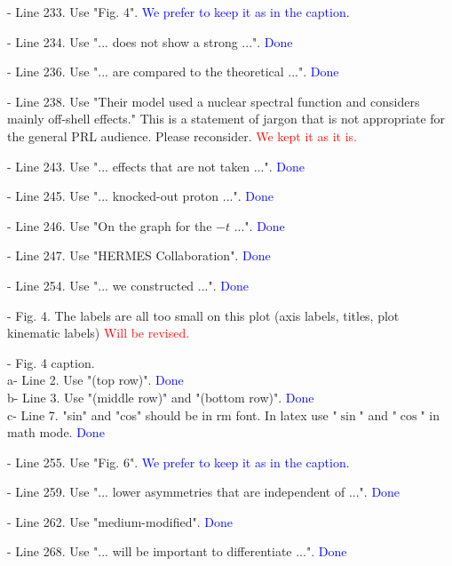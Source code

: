 \documentclass[a4paper,11pt,twoside]{article}
\begin{document}
\begin{enumerate}
- Line 233. Use "Fig. 4".
      \textcolor{blue}{We prefer to keep it as in the caption.}

- Line 234. Use "... does not show a strong ...".
      \textcolor{blue}{Done}

- Line 236. Use "... are compared to the theoretical ...".
      \textcolor{blue}{Done}

- Line 238. Use "Their model used a nuclear spectral function and considers 
   mainly off-shell effects." This is a statement of jargon that is not 
   appropriate for the general PRL audience.  Please reconsider.
      \textcolor{red}{We kept it as it is.}

- Line 243. Use "... effects that are not taken ...".
      \textcolor{blue}{Done}

- Line 245. Use "... knocked-out proton ...".
      \textcolor{blue}{Done}

- Line 246. Use "On the graph for the $-t$ ...".
      \textcolor{blue}{Done}

- Line 247. Use "HERMES Collaboration".
      \textcolor{blue}{Done}

- Line 254. Use "... we constructed ...".
      \textcolor{blue}{Done}

- Fig. 4. The labels are all too small on this plot (axis labels, titles, plot 
  kinematic labels)
      \textcolor{red}{Will be revised.}

- Fig. 4 caption.\\
   a- Line 2. Use "(top row)".
      \textcolor{blue}{Done}\\
   b- Line 3. Use "(middle row)" and "(bottom row)".
      \textcolor{blue}{Done}\\
   c- Line 7. "sin" and "cos" should be in rm font. In latex use "$\sin$" and 
   "$\cos$" in math mode.
      \textcolor{blue}{Done}

- Line 255. Use "Fig. 6".
      \textcolor{blue}{We prefer to keep it as in the caption.}

- Line 259. Use "... lower asymmetries that are independent of ...".
      \textcolor{blue}{Done}

- Line 262. Use "medium-modified".
      \textcolor{blue}{Done}

- Line 268. Use "... will be important to differentiate ...".
      \textcolor{blue}{Done}


\end{enumerate}
\end{document}
